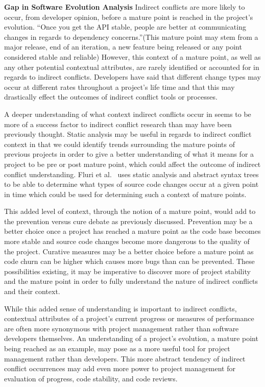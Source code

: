 \documentclass[conference]{IEEEtran}
\begin{document}
\textbf{Gap in Software Evolution Analysis} Indirect conflicts are more likely to occur,
from developer opinion, before a mature point is reached in the project's evolution. ``Once you get the API stable, people are 
better at communicating changes in regards to dependency concerns.''(This mature point may stem from a major release,
end of an iteration, a new feature being released or any point considered stable and reliable) However, this context of a 
mature point, as well as any other
potential contextual attributes, are rarely identified or accounted for in regards to indirect conflicts. Developers have said
that different change types may occur at different rates throughout a project's life time and that this
may drastically effect the outcomes of indirect conflict tools or processes.

A deeper understanding of what context indirect conflicts occur in seems to be more of a success factor to indirect conflict
research than may have been previously thought. Static analysis may be useful in regards to indirect conflict context in that we
could identify trends surrounding the mature points of previous projects in order to give a better understanding of what it
means for a project to be pre or post mature point, which could affect the outcome of indirect conflict understanding.
Fluri et al.~\cite{Fluri:2007:CDT} uses static analysis and abstract syntax trees to be able to determine what types of source code
changes occur at a given point in time which could be used for determining such a context of mature points.

This added level of context, through the notion of a mature point, 
would add to the prevention versus cure debate as previously discussed. Prevention may be a better
choice once a project has reached a mature point as the code base becomes more stable and source code changes become more dangerous
to the quality of the project. Curative measures may be a better choice before a mature point as code churn can be higher which
causes more bugs than can be prevented. These possibilities existing, it may be imperative to discover more of project stability
and the mature point in order to fully understand the nature of indirect conflicts and their context.

While this added sense of understanding is important to indirect conflicts, contextual attributes of a project's current progress
or measures of performance are often more synonymous with project management
rather than software developers themselves. An understanding of a project's evolution, a mature point being reached as an example,
may pose as a more useful tool for project management rather than developers. This more abstract tendency of indirect
conflict occurrences may add even more power to project management for evaluation of progress, code stability, and code reviews.
\end{document}
